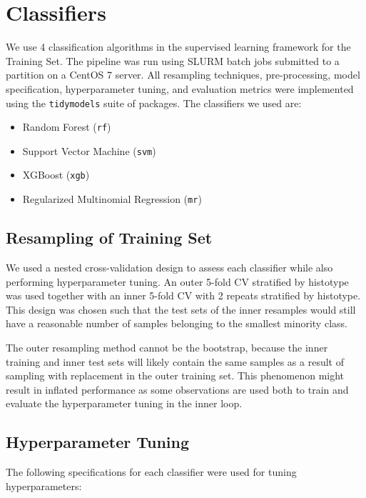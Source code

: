 \documentclass[
]{report}
\providecommand{\tightlist}{%
  \setlength{\itemsep}{0pt}\setlength{\parskip}{0pt}}
\begin{document}
\section{Classifiers}\label{classifiers}

We use 4 classification algorithms in the supervised learning framework for the Training Set. The pipeline was run using SLURM batch jobs submitted to a partition on a CentOS 7 server. All resampling techniques, pre-processing, model specification, hyperparameter tuning, and evaluation metrics were implemented using the \texttt{tidymodels} suite of packages. The classifiers we used are:

\begin{itemize}
\tightlist
\item
  Random Forest (\texttt{rf})
\item
  Support Vector Machine (\texttt{svm})
\item
  XGBoost (\texttt{xgb})
\item
  Regularized Multinomial Regression (\texttt{mr})
\end{itemize}

\subsection{Resampling of Training Set}\label{resampling-of-training-set}

We used a nested cross-validation design to assess each classifier while also performing hyperparameter tuning. An outer 5-fold CV stratified by histotype was used together with an inner 5-fold CV with 2 repeats stratified by histotype. This design was chosen such that the test sets of the inner resamples would still have a reasonable number of samples belonging to the smallest minority class.

The outer resampling method cannot be the bootstrap, because the inner training and inner test sets will likely contain the same samples as a result of sampling with replacement in the outer training set. This phenomenon might result in inflated performance as some observations are used both to train and evaluate the hyperparameter tuning in the inner loop.

\subsection{Hyperparameter Tuning}\label{hyperparameter-tuning}

The following specifications for each classifier were used for tuning hyperparameters:
\end{document}
